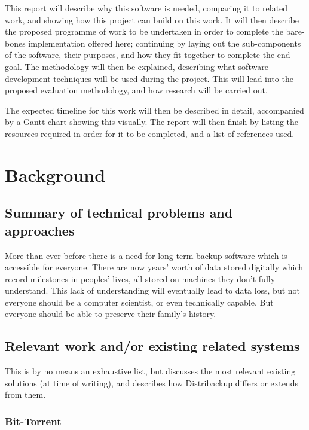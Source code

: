 \documentclass[12pt,a4paper,]{book}
\begin{document}
This report will describe why this software is needed, comparing it to
related work, and showing how this project can build on this work. It
will then describe the proposed programme of work to be undertaken in
order to complete the bare-bones implementation offered here; continuing
by laying out the sub-components of the software, their purposes, and
how they fit together to complete the end goal. The methodology will
then be explained, describing what software development techniques will
be used during the project. This will lead into the proposed evaluation
methodology, and how research will be carried out.

The expected timeline for this work will then be described in detail,
accompanied by a Gantt chart showing this visually. The report will then
finish by listing the resources required in order for it to be
completed, and a list of references used.

\section{Background}\label{background}

\subsection{Summary of technical problems and
approaches}\label{summary-of-technical-problems-and-approaches}

More than ever before there is a need for long-term backup software
which is accessible for everyone. There are now years' worth of data
stored digitally which record milestones in peoples' lives, all stored
on machines they don't fully understand. This lack of understanding will
eventually lead to data loss, but not everyone should be a computer
scientist, or even technically capable. But everyone should be able to
preserve their family's history.

\subsection{Relevant work and/or existing related
systems}\label{relevant-work-andor-existing-related-systems}

This is by no means an exhaustive list, but discusses the most relevant
existing solutions (at time of writing), and describes how Distribackup
differs or extends from them.

\subsubsection{Bit-Torrent}\label{bit-torrent}
\end{document}
